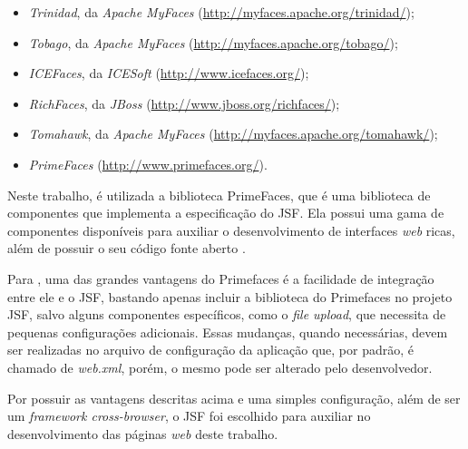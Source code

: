 \begin{itemize}
	\item \textit{Trinidad}, da \textit{Apache MyFaces}
	(\url{http://myfaces.apache.org/trinidad/});
	
	\item \textit{Tobago}, da \textit{Apache MyFaces}
	(\url{http://myfaces.apache.org/tobago/});
	
	\item \textit{ICEFaces}, da \textit{ICESoft} (\url{http://www.icefaces.org/});
	
	\item \textit{RichFaces}, da \textit{JBoss}
	(\url{http://www.jboss.org/richfaces/});
	
	\item \textit{Tomahawk}, da \textit{Apache MyFaces}
	(\url{http://myfaces.apache.org/tomahawk/});
	
	\item \textit{PrimeFaces} (\url{http://www.primefaces.org/}).
\end{itemize}

\par Neste trabalho, é utilizada a biblioteca PrimeFaces, que é uma
biblioteca de componentes que implementa a especificação do JSF. Ela 
possui uma gama de componentes disponíveis para auxiliar o desenvolvimento 
de interfaces \textit{web} ricas, além de possuir o seu código fonte aberto 
\cite{ross_borsoi_uso_primefaces}.

\par Para , uma das grandes vantagens
do Primefaces é a facilidade de integração entre ele e o JSF, bastando apenas
incluir a biblioteca do Primefaces no projeto JSF, salvo alguns componentes
específicos, como o \textit{file upload}, que necessita de pequenas configurações adicionais.
Essas mudanças, quando necessárias, devem ser realizadas no arquivo de
configuração da aplicação que, por padrão, é chamado de \textit{web.xml}, porém,
o mesmo pode ser alterado pelo desenvolvedor.

\par Por possuir as vantagens descritas acima e uma simples configuração, além de ser um 
\textit{framework cross-browser\footnotemark[5]}, o JSF foi escolhido para
auxiliar no desenvolvimento das páginas \textit{web} deste trabalho.


